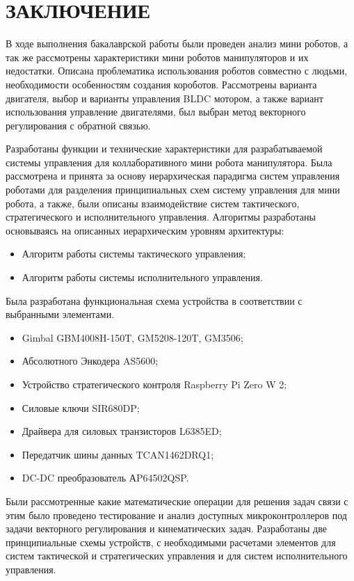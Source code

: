 
\section*{\centering ЗАКЛЮЧЕНИЕ}

В ходе выполнения бакалаврской работы были проведен анализ мини роботов, а так же рассмотрены характеристики  мини роботов манипуляторов и их недостатки. Описана проблематика использования роботов совместно с людьми, необходимости особенностям создания короботов. 
Рассмотрены варианта двигателя, выбор и варианты управления BLDC мотором, а также вариант использования управление двигателями, был выбран метод векторного регулирования с обратной связью.

Разработаны функции и технические характеристики для разрабатываемой системы управления для коллаборативного мини робота манипулятора. Была рассмотрена и принята за основу иерархическая парадигма систем управления роботами для разделения принципиальных схем систему управления для мини робота, а также, были описаны взаимодействие систем тактического, стратегического и исполнительного управления. 
Алгоритмы разработаны основываясь на описанных иерархическим уровням архитектуры:
\begin{itemize}
	\item Алгоритм работы системы тактического управления;
	\item Алгоритм работы системы исполнительного управления.
\end{itemize}
Была разработана функциональная схема устройства в соответствии с выбранными элементами.
\begin{itemize}
	\item Gimbal GBM4008H-150T, GM5208-120T, GM3506;
	\item Абсолютного Энкодера AS5600;
	\item Устройство стратегического контроля Raspberry Pi Zero W 2;
	\item Силовые ключи SIR680DP;
	\item Драйвера для силовых транзисторов L6385ED;
	\item Передатчик шины данных TCAN1462DRQ1;
	\item DC-DC преобразователь АP64502QSP.
\end{itemize}
Были рассмотренные какие математические операции для решения задач связи с этим было проведено тестирование и анализ доступных микроконтроллеров под задачи векторного регулирования и кинематических задач. Разработаны две принципиальные схемы устройств, с необходимыми расчетами элементов для систем тактической и стратегических управления и для систем исполнительного управления.
